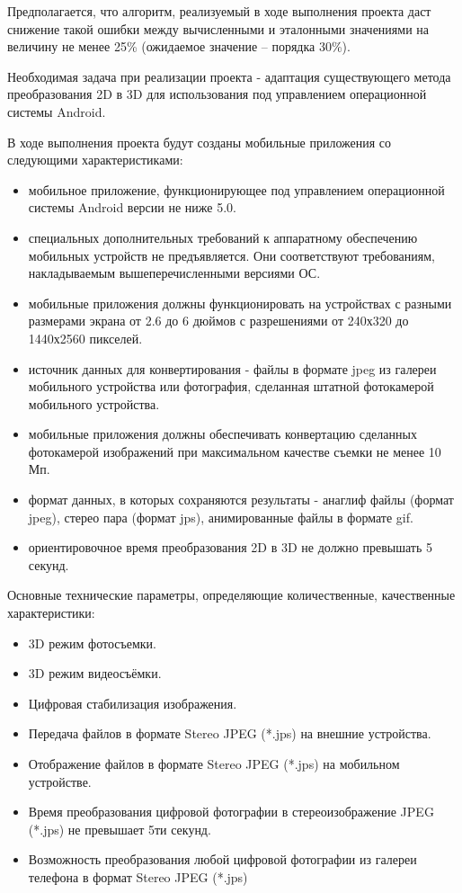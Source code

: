 Предполагается, что алгоритм, реализуемый в ходе выполнения проекта даст снижение такой ошибки между вычисленными и эталонными значениями на величину не менее 25\% (ожидаемое значение – порядка 30\%).

Необходимая задача при реализации проекта - адаптация существующего метода преобразования 2D в 3D для использования под управлением операционной системы Android.

В ходе выполнения проекта будут созданы мобильные приложения со следующими характеристиками:

\begin{itemize}
	\item мобильное приложение, функционирующее под управлением операционной системы Android версии не ниже 5.0.
	\item специальных дополнительных требований к аппаратному обеспечению мобильных устройств не предъявляется. Они соответствуют требованиям, накладываемым вышеперечисленными версиями ОС.
	\item мобильные приложения должны функционировать на устройствах с разными размерами экрана от 2.6 до 6 дюймов с разрешениями от 240х320 до 1440х2560 пикселей.
	\item источник данных для конвертирования - файлы в формате jpeg из галереи мобильного устройства или фотография, сделанная штатной фотокамерой мобильного устройства.
	\item мобильные приложения должны обеспечивать конвертацию сделанных фотокамерой изображений при максимальном качестве съемки не менее 10 Мп.
	\item формат данных, в которых сохраняются результаты - анаглиф файлы (формат jpeg), стерео пара (формат jps), анимированные файлы в формате gif.
	\item ориентировочное время преобразования 2D в 3D не должно превышать 5 секунд.
\end{itemize}

Основные технические параметры, определяющие количественные, качественные характеристики:

\begin{itemize}
\item 3D режим фотосъемки.
\item 3D режим видеосъёмки. 
\item Цифровая стабилизация изображения.
\item Передача файлов в формате Stereo JPEG (*.jps) на внешние устройства. 
\item Отображение файлов в формате Stereo JPEG (*.jps) на мобильном устройстве. 
\item Время преобразования цифровой фотографии в стереоизображение JPEG (*.jps) не превышает 5ти секунд. 
\item Возможность преобразования любой цифровой фотографии из галереи телефона в формат Stereo JPEG (*.jps)
\end{itemize}

